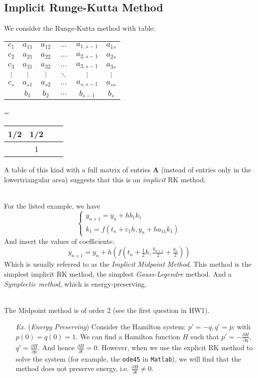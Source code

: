 \documentclass[a4paper, 11pt]{article}
\begin{document}
\subsection{Implicit Runge-Kutta Method}
We consider the Runge-Kutta method with table:
\begin{center}
	\begin{tabular}{c|ccccc}
	$c_1$ & $a_{11}$ & $a_{12}$ & $\hdots$ & $a_{1,s-1}$ & $a_{1s}$\\
	$c_2$ & $a_{21}$ & $a_{22}$ & $\hdots$ & $a_{2,s-1}$ & $a_{2s}$\\
	$c_3$ & $a_{31}$ & $a_{32}$ & $\hdots$ & $a_{3,s-1}$ & $a_{3s}$\\
	$\vdots$ & $\vdots$ & $\vdots$ & $\ddots$ & $\vdots$ & $\vdots$ \\
	$c_s$ & $a_{s1}$ & $a_{s2} $ & $\hdots$ & $a_{s,s-1}$ & $a_{ss}$\\
	\hline
	 & $b_1$ & $b_2$ & $\hdots$ & $b_{s-1}$ & $b_s$
	\end{tabular} = 
	\begin{tabular}{c|ccc}
	1/2 & 1/2\\
	\hline
	 & 1 
	\end{tabular}
\end{center}
A table of this kind with a full matrix of entries $\bm{A}$ (instead of entries only in the lowertriangular area) suggests that this is an \emph{implicit} RK method. 

~\\
For the listed example, we have
\begin{equation}
	\begin{cases}
	y_{n+1} = y_n + hb_1 k_1 \\
	k_1 = f(t_n + c_1 h, y_n + ha_{11}k_1)
	\end{cases}
\end{equation}
And insert the values of coefficients:
$$
y_{n+1} = y_n + h\left(f(t_n+\tfrac{1}{2}h, \tfrac{y_{n+1}}{2}+\tfrac{y_n}{2})\right)
$$
Which is usually referred to as the \emph{Implicit Midpoint Method}. This method is the simplest implicit RK method, the simplest \emph{Gauss-Legendre} method. And a \emph{Symplectic method}, which is energy-preserving.

~\\
The Midpoint method is of order 2 (see the first question in HW1).
\begin{itemize}
	\item[\textit{Ex.}] (\emph{Energy Preserving}) Consider the Hamilton system: $p'=-q, q'=p$; with $p(0)=q(0)=1$. We can find a Hamilton function $H$ such that $p'=-\frac{\partial H}{\partial q}$, $q'=\frac{\partial H}{\partial p}$. And hence $\frac{\partial H}{\partial t}=0$. However, when we use the explicit RK method to solve the system (for example, the \texttt{ode45} in \texttt{Matlab}), we will find that the method does not preserve energy, i.e. $\frac{\partial H}{\partial t}\ne 0$.
\end{itemize}
\end{document}
